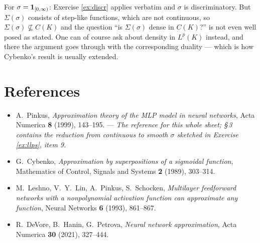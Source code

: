 \documentclass[11pt,a4paper]{article}
\begin{document}
For $\sigma = \mathbf{1}_{[0,\infty)}$: Exercise \ref{ex:discr} applies verbatim and $\sigma$ is
discriminatory. But $\Sigma(\sigma)$ consists of step-like functions, which are not continuous, so
$\Sigma(\sigma)\not\subseteq C(K)$ and the question ``is $\Sigma(\sigma)$ dense in $C(K)$?'' is not
even well posed as stated. One can of course ask about density in $L^p(K)$ instead, and there the
argument goes through with the corresponding duality --- which is how Cybenko's result is usually
extended.

\newpage
\fi

\section*{References}

\begin{itemize}[leftmargin=*, itemsep=4pt]
\item A.~Pinkus, \emph{Approximation theory of the MLP model in neural networks}, Acta Numerica
\textbf{8} (1999), 143--195. --- \emph{The reference for this whole sheet; §\,3 contains the
reduction from continuous to smooth $\sigma$ sketched in Exercise \ref{ex:llps}, item 9.}
\item G.~Cybenko, \emph{Approximation by superpositions of a sigmoidal function}, Mathematics of
Control, Signals and Systems \textbf{2} (1989), 303--314.
\item M.~Leshno, V.~Y.~Lin, A.~Pinkus, S.~Schocken, \emph{Multilayer feedforward networks with a
nonpolynomial activation function can approximate any function}, Neural Networks \textbf{6} (1993),
861--867.
\item R.~DeVore, B.~Hanin, G.~Petrova, \emph{Neural network approximation}, Acta Numerica
\textbf{30} (2021), 327--444.
\end{itemize}
\end{document}
